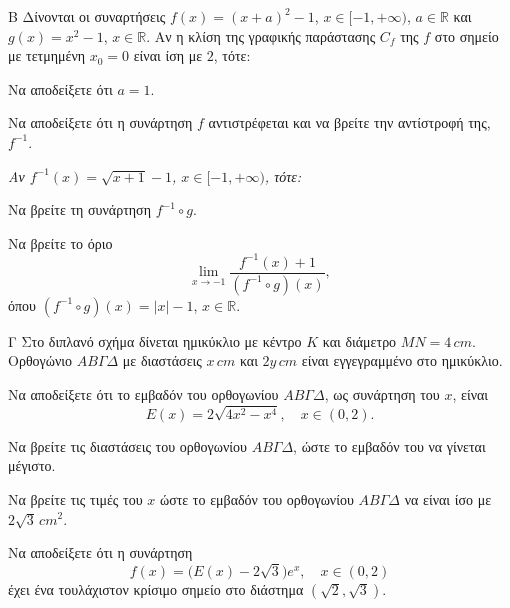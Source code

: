 \begin{thema}{Β}
Δίνονται οι συναρτήσεις $f(x) = (x + a)^2 - 1$, $x \in [-1, +\infty)$, $a \in \mathbb{R}$ και $g(x) = x^2 - 1$, $x \in \mathbb{R}$. Αν η κλίση της γραφικής παράστασης $C_f$ της $f$ στο σημείο με τετμημένη $x_0 = 0$ είναι ίση με $2$, τότε:
\begin{erwthma}
    \item Να αποδείξετε ότι $a = 1$. 

    \item Να αποδείξετε ότι η συνάρτηση $f$ αντιστρέφεται και να βρείτε την αντίστροφή της, $f^{-1}$. 

    \textit{Αν $f^{-1}(x) = \sqrt{x+1} - 1$, $x \in [-1, +\infty)$, τότε:}

    \item Να βρείτε τη συνάρτηση $f^{-1} \circ g$. 

    \item Να βρείτε το όριο
    \[
    \lim_{x \to -1} \frac{f^{-1}(x) + 1}{(f^{-1} \circ g)(x)},
    \]
    όπου $(f^{-1} \circ g)(x) = |x| - 1$, $x \in \mathbb{R}$. 
\end{erwthma}
\end{thema}

\begin{thema}{Γ}
Στο διπλανό σχήμα δίνεται ημικύκλιο με κέντρο $K$ και διάμετρο $MN = 4\,\si{cm}$. Ορθογώνιο $AB\Gamma\Delta$ με διαστάσεις $x\,\si{cm}$ και $2y\,\si{cm}$ είναι εγγεγραμμένο στο ημικύκλιο.
\begin{erwthma}
    \item Να αποδείξετε ότι το εμβαδόν του ορθογωνίου $AB\Gamma\Delta$, ως συνάρτηση του $x$, είναι
    \[
    E(x) = 2\sqrt{4x^2 - x^4}, \quad x \in (0, 2).
    \]

    \item Να βρείτε τις διαστάσεις του ορθογωνίου $AB\Gamma\Delta$, ώστε το εμβαδόν του να γίνεται μέγιστο. 

    \item Να βρείτε τις τιμές του $x$ ώστε το εμβαδόν του ορθογωνίου $AB\Gamma\Delta$ να είναι ίσο με $2\sqrt{3}\,\si{cm}^2$. 

    \item Να αποδείξετε ότι η συνάρτηση
    \[
    f(x) = \bigl(E(x) - 2\sqrt{3}\bigr)e^x, \quad x \in (0, 2)
    \]
    έχει ένα τουλάχιστον κρίσιμο σημείο στο διάστημα $(\sqrt{2}, \sqrt{3})$. 
\end{erwthma}
\end{thema}

